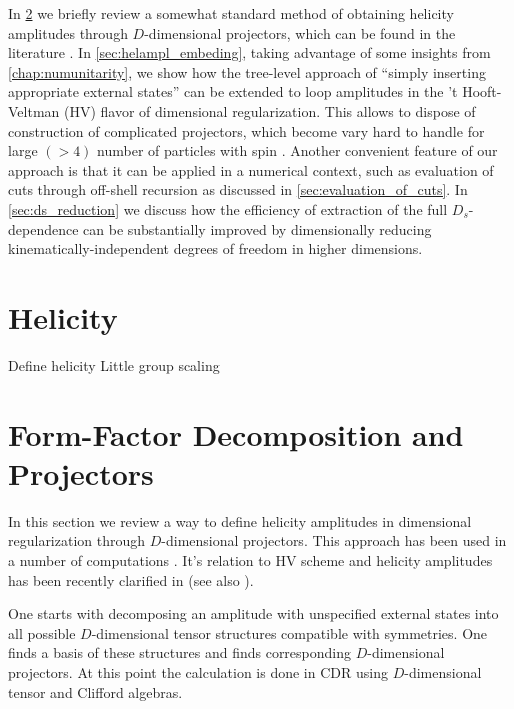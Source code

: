 In \cref{sec:helampl_projectors} we briefly review a somewhat standard 
method of obtaining helicity amplitudes through $D$-dimensional projectors,
which can be found in the literature \cite{Garland:2002ak, Moch:2002hm, Glover:2003cm, Glover:2004si,Gehrmann:2009vu,Gehrmann:2011aa}. 
In \cref{sec:helampl_embeding}, 
taking advantage of some insights from \cref{chap:numunitarity},
we show how the tree-level approach of ``simply inserting appropriate external states'' can
be extended to loop amplitudes in the 't Hooft-Veltman (HV) flavor of dimensional regularization.
This allows to dispose of construction of complicated projectors, which
become vary hard to handle for large $(> 4)$ number of particles with spin \cite{Peraro:2019cjj}. 
Another convenient feature of our approach is that it can be applied in a numerical context, such
as evaluation of cuts through off-shell recursion as discussed in \cref{sec:evaluation_of_cuts}.
In \cref{sec:ds_reduction} we discuss how
the efficiency of extraction of the full $D_s$-dependence can be substantially improved
by dimensionally reducing kinematically-independent degrees of freedom in higher dimensions.


\section{Helicity}
Define helicity
Little group scaling

\section{Form-Factor Decomposition and Projectors}
\label{sec:helampl_projectors}

In this section we review a way to define helicity amplitudes in dimensional regularization through
$D$-dimensional projectors.
This approach has been used in a number of computations \cite{Garland:2002ak, Moch:2002hm, Glover:2003cm, Glover:2004si,Gehrmann:2009vu,Gehrmann:2011aa}.
It's relation to HV scheme and helicity amplitudes has been recently clarified in \cite{Peraro:2019cjj} (see also \cite{Chen:2019wyb}).

One starts with decomposing an amplitude with unspecified external states into all possible $D$-dimensional tensor structures compatible
with symmetries. One finds a basis of these structures and finds corresponding $D$-dimensional projectors.
At this point the calculation is done in CDR using $D$-dimensional tensor and Clifford algebras.

